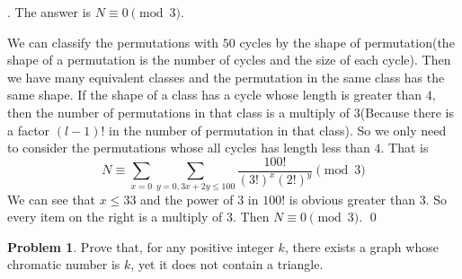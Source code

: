 \documentclass[12pt]{article}
\theoremstyle{definition}
\newtheorem{hw}{Problem}
\newenvironment{sol}
  {\par\vspace{3mm}\noindent{\it Solution}.}
  {\qed}
\begin{document}
\begin{sol}
	The answer is $N \equiv 0 \pmod{3}$.
	
	We can classify the permutations with $50$ cycles by the shape of permutation(the shape of a permutation is the number of cycles and the size of each cycle). Then we have many equivalent classes and the permutation in the same class has the same shape. If the shape of a class has a cycle whose length is greater than $4$, then the number of permutations in that class is a multiply of $3$(Because there is a factor $(l-1)!$ in the number of permutation in that class). So we only need to consider the permutations whose all cycles has length less than $4$. That is
	$$
		N \equiv \sum_{x = 0}\sum_{y = 0, 3x + 2y \leq 100}\frac{100!}{(3!)^x(2!)^y} \pmod{3}
	$$
	We can see that $x \leq 33$ and the power of $3$ in $100!$ is obvious greater than $3$. So every item on the right is a multiply of $3$. Then $N \equiv 0 \pmod{3}$.
\end{sol}

\begin{hw}
Prove that, for any positive integer $k$, there exists
a graph whose chromatic number is $k$, yet it does not
contain a triangle.
\end{hw}
\end{document}
